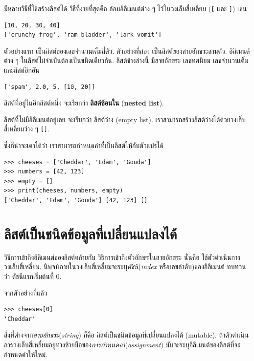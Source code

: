 มีหลายวิธีที่ใช้สร้างลิสต์ได้
วิธีที่ง่ายที่สุดคือ ล้อมอิลิเมนต์ต่าง ๆ ไว้ในวงเล็มสี่เหลี่ยม
(\verb"[" และ \verb"]") เช่น

\begin{verbatim}
[10, 20, 30, 40]
['crunchy frog', 'ram bladder', 'lark vomit']
\end{verbatim}
%
ตัวอย่างแรก เป็นลิสต์ของเลขจำนวนเต็มสี่ตัว.
ตัวอย่างที่สอง เป็นลิสต์ของสายอักขระสามตัว.
อิลิเมนต์ต่าง ๆ ในลิสต์ไม่จำเป็นต้องเป็นชนิดเดียวกัน.
ลิสต์ข้างล่างนี้ มีสายอักขระ เลขทศนิยม เลขจำนวนเต็ม และลิสต์อีกอัน

\begin{verbatim}
['spam', 2.0, 5, [10, 20]]
\end{verbatim}
%
ลิสต์ที่อยู่ในอีกลิสต์หนึ่ง จะเรียกว่า \textbf{ลิสต์ซ้อนใน} (\textbf{nested list}).

ลิสต์ที่ไม่มีอิลิเมนต์อยู่เลย จะเรียกว่า ลิสต์ว่าง (empty list).
เราสามารถสร้างลิสต์ว่างได้ด้วยวงเล็บสี่เหลี่ยมว่าง ๆ \verb"[]".

ซึ่งก็น่าจะเดาได้ว่า เราสามารถกำหนดค่าที่เป็นลิสต์ให้กับตัวแปรได้

\begin{verbatim}
>>> cheeses = ['Cheddar', 'Edam', 'Gouda']
>>> numbers = [42, 123]
>>> empty = []
>>> print(cheeses, numbers, empty)
['Cheddar', 'Edam', 'Gouda'] [42, 123] []
\end{verbatim}
%

\section{ลิสต์เป็นชนิดข้อมูลที่เปลี่ยนแปลงได้}
\label{mutable}

วิธีการเข้าถึงอิลิเมนต์ของลิสต์คล้ายกับ
วิธีการเข้าถึงตัวอักษรในสายอักขระ
นั่นคือ ใช้ตัวดำเนินการวงเล็บสี่เหลี่ยม.
นิพจน์ภายในวงเล็บสี่เหลี่ยมจะระบุ\textit{ดัชนี}(\textit{index} หรือเลขลำดับ)ของอิลิเมนต์
ทบทวนว่า ดัชนีแรกเริ่มต้นที่ 0.

จากตัวอย่างที่แล้ว
\begin{verbatim}
>>> cheeses[0]
'Cheddar'
\end{verbatim}
%
สิ่งที่ต่างจาก\textit{สายอักขระ}(\textit{string}) 
ก็คือ ลิสต์เป็นชนิดข้อมูลที่เปลี่ยนแปลงได้ (mutable).
ถ้าตัวดำเนินการวงเล็บสี่เหลี่ยมอยู่ทางซ้ายมือของ\textit{การกำหนดค่า}(\textit{assignment})
มันจะระบุอิลิเมนต์ของลิสต์ที่จะกำหนดค่าให้ใหม่.

